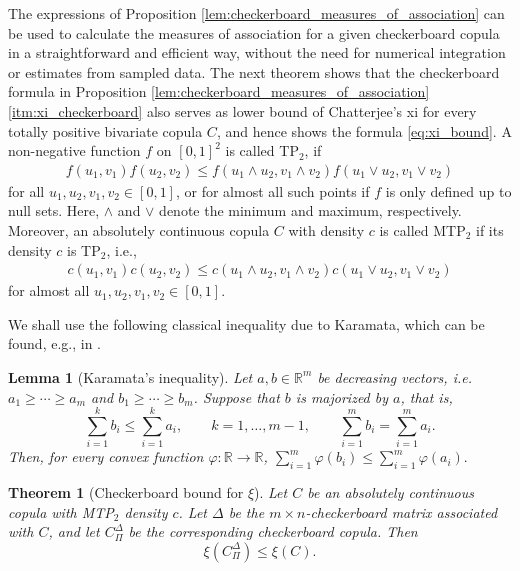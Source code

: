 \documentclass{article}
\newtheorem{theorem}[thm]{Theorem}
\newtheorem{lemma}[thm]{Lemma}
\theoremstyle{definition}
\begin{document}
The expressions of Proposition \ref{lem:checkerboard_measures_of_association} can be used to calculate the measures of association for a given checkerboard copula in a straightforward and efficient way, without the need for numerical integration or estimates from sampled data.
The next theorem shows that the checkerboard formula in Proposition \ref{lem:checkerboard_measures_of_association} \ref{itm:xi_checkerboard} also serves as lower bound of Chatterjee's xi for every totally positive bivariate copula $C$, and hence shows the formula \eqref{eq:xi_bound}.
A non-negative function \(f\) on \([0,1]^2\) is called TP\(_2\), if
\begin{align}\label{eq:tp2}
  f(u_1,v_1)f(u_2,v_2)
  \le
  f(u_1\wedge u_2,v_1\wedge v_2)
  f(u_1\vee u_2,v_1\vee v_2)
\end{align}
for all \(u_1,u_2,v_1,v_2\in[0,1]\), or for almost all such points if \(f\)
is only defined up to null sets.
Here, $\wedge$ and $\vee$ denote the minimum and maximum, respectively.
Moreover, an absolutely continuous copula \(C\) with density \(c\) is called MTP\(_2\) if its density \(c\) is TP\(_2\), i.e.,
\begin{align}\label{eq:mtp2}
  c\left(u_1,v_1\right)c\left(u_2,v_2\right)
  \le
  c\left(u_1\wedge u_2,v_1\wedge v_2\right)
  c\left(u_1\vee u_2,v_1\vee v_2\right)
\end{align}
for almost all \(u_1,u_2,v_1,v_2\in[0,1]\).

We shall use the following classical inequality due to Karamata, which can be found, e.g., in \cite[Prop.~4.B.1, pp.~156--157]{marshall2011inequalities}.

\begin{lemma}[Karamata's inequality]\label{lem:karamata}
    Let \(a,b\in\mathbb R^m\) be decreasing vectors, i.e.
    \(a_1\ge\cdots\ge a_m\) and \(b_1\ge\cdots\ge b_m\). Suppose that
    \(b\) is majorized by \(a\), that is,
    \[
        \sum_{i=1}^k b_i
        \le
        \sum_{i=1}^k a_i,
        \qquad k=1,\ldots,m-1,
        \qquad
        \sum_{i=1}^m b_i
        =
        \sum_{i=1}^m a_i.
    \]
    Then, for every convex function \(\varphi\colon\mathbb R\to\mathbb R\),
    \(
        \sum_{i=1}^m \varphi(b_i)
        \le
        \sum_{i=1}^m \varphi(a_i).
    \)
\end{lemma}

\begin{theorem}[Checkerboard bound for $\xi$]\label{thm:xi_bounds}
Let \(C\) be an absolutely continuous copula with MTP$_2$ density \(c\).
Let \(\Delta\) be the \(m\times n\)-checkerboard matrix associated with \(C\), and let \(C^\Delta_\Pi\) be the corresponding checkerboard copula.
Then
\[
    \xi(C^\Delta_\Pi)\le \xi(C).
\]
\end{theorem}
\end{document}
